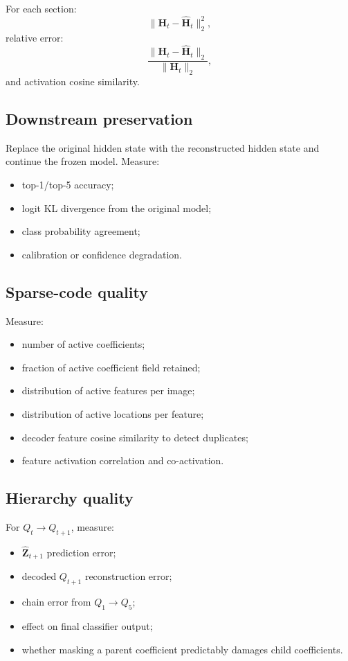 \documentclass[11pt]{article}
\newcommand{\Htens}{\mathbf{H}}
\newcommand{\Hhat}{\widehat{\mathbf{H}}}
\newcommand{\Zhat}{\widehat{\mathbf{Z}}}
\begin{document}
For each section:
\[
\|\Htens_t-\Hhat_t\|_2^2,
\]
relative error:
\[
\frac{\|\Htens_t-\Hhat_t\|_2}{\|\Htens_t\|_2},
\]
and activation cosine similarity.

\subsection{Downstream preservation}

Replace the original hidden state with the reconstructed hidden state and continue the frozen model. Measure:
\begin{itemize}[leftmargin=*]
    \item top-1/top-5 accuracy;
    \item logit KL divergence from the original model;
    \item class probability agreement;
    \item calibration or confidence degradation.
\end{itemize}

\subsection{Sparse-code quality}

Measure:
\begin{itemize}[leftmargin=*]
    \item number of active coefficients;
    \item fraction of active coefficient field retained;
    \item distribution of active features per image;
    \item distribution of active locations per feature;
    \item decoder feature cosine similarity to detect duplicates;
    \item feature activation correlation and co-activation.
\end{itemize}

\subsection{Hierarchy quality}

For \(Q_t \rightarrow Q_{t+1}\), measure:
\begin{itemize}[leftmargin=*]
    \item \(\Zhat_{t+1}\) prediction error;
    \item decoded \(Q_{t+1}\) reconstruction error;
    \item chain error from \(Q_1 \rightarrow Q_5\);
    \item effect on final classifier output;
    \item whether masking a parent coefficient predictably damages child coefficients.
\end{itemize}
\end{document}
